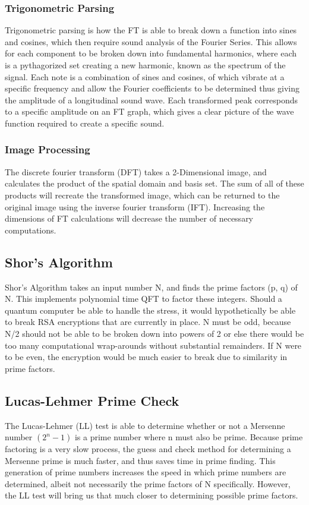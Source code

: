 \documentclass[a4paper,11pt]{article}
\theoremstyle{mytheor}
\begin{document}
\subsubsection{Trigonometric Parsing}
\cite{SF}
Trigonometric parsing is how the FT is able to break down a function into sines and cosines, which then require sound analysis of the Fourier Series.  This allows for each component to be broken down into fundamental harmonics, where each is a pythagorized set creating a new harmonic, known as the spectrum of the signal.  Each note is a combination of sines and cosines, of which vibrate at a specific frequency and allow the Fourier coefficients to be determined thus giving the amplitude of a longitudinal sound wave.  Each transformed peak corresponds to a specific amplitude on an FT graph, which gives a clear picture of the wave function required to create a specific sound.

\subsubsection{Image Processing}
\cite{Vision}\cite{PErr}\cite{Robo}\cite{Img}\cite{DIP}
The discrete fourier transform (DFT) takes a 2-Dimensional image, and calculates the product of the spatial domain and basis set.  The sum of all of these products will recreate the transformed image, which can be returned to the original image using the inverse fourier transform (IFT).  Increasing the dimensions of FT calculations will decrease the number of necessary computations.

\subsection{Shor's Algorithm}
\cite{C5}\cite{Prime}\cite{QCQI}\cite{DFa}
Shor’s Algorithm takes an input number N, and finds the prime factors (p, q) of N.  This implements polynomial time QFT to factor these integers.  Should a quantum computer be able to handle the stress, it would hypothetically be able to break RSA encryptions that are currently in place.  N must be odd, because N/2 should not be able to be broken down into powers of 2 or else there would be too many computational wrap-arounds without substantial remainders.  If N were to be even, the encryption would be much easier to break due to similarity in prime factors.  

\subsection{Lucas-Lehmer Prime Check}\label{sec:lehmer}
\cite{Prime}
The Lucas-Lehmer (LL) test is able to determine whether or not a Mersenne number $(2^n - 1)$ is a prime number where n must also be prime.  Because prime factoring is a very slow process, the guess and check method for determining a Mersenne prime is much faster, and thus saves time in prime finding.  This generation of prime numbers increases the speed in which prime numbers are determined, albeit not necessarily the prime factors of N specifically.  However, the LL test will bring us that much closer to determining possible prime factors.  
\end{document}
